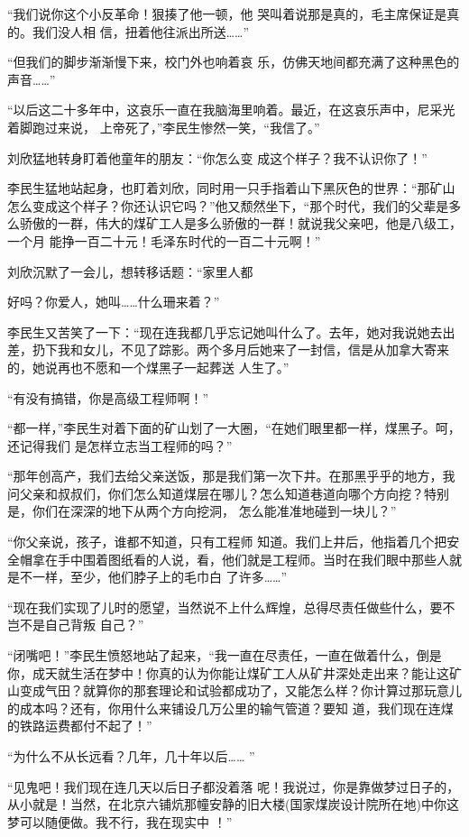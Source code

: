 \documentclass{article}
\begin{document}
“我们说你这个小反革命！狠揍了他一顿，他
\newpage
哭叫着说那是真的，毛主席保证是真的。我们没人相
信，扭着他往派出所送……” 

“但我们的脚步渐渐慢下来，校门外也响着哀
乐，仿佛天地间都充满了这种黑色的声音……” 

“以后这二十多年中，这哀乐一直在我脑海里响着。最近，在这哀乐声中，尼采光着脚跑过来说，
上帝死了，”李民生惨然一笑，“我信了。” 

刘欣猛地转身盯着他童年的朋友：“你怎么变
成这个样子？我不认识你了！” 

李民生猛地站起身，也盯着刘欣，同时用一只手指着山下黑灰色的世界：“那矿山怎么变成这个样子？你还认识它吗？”他又颓然坐下，“那个时代，我们的父辈是多么骄傲的一群，伟大的煤矿工人是多么骄傲的一群！就说我父亲吧，他是八级工，一个月
能挣一百二十元！毛泽东时代的一百二十元啊！” 

刘欣沉默了一会儿，想转移话题：“家里人都
\newpage

好吗？你爱人，她叫……什么珊来着？” 

李民生又苦笑了一下：“现在连我都几乎忘记她叫什么了。去年，她对我说她去出差，扔下我和女儿，不见了踪影。两个多月后她来了一封信，信是从加拿大寄来的，她说再也不愿和一个煤黑子一起葬送
人生了。” 


“有没有搞错，你是高级工程师啊！” 

“都一样，”李民生对着下面的矿山划了一大圈，“在她们眼里都一样，煤黑子。呵，还记得我们
是怎样立志当工程师的吗？” 

“那年创高产，我们去给父亲送饭，那是我们第一次下井。在那黑乎乎的地方，我问父亲和叔叔们，你们怎么知道煤层在哪儿？怎么知道巷道向哪个方向挖？特别是，你们在深深的地下从两个方向挖洞，
怎么能准准地碰到一块儿？” 

“你父亲说，孩子，谁都不知道，只有工程师
\newpage
知道。我们上井后，他指着几个把安全帽拿在手中围着图纸看的人说，看，他们就是工程师。当时在我们眼中那些人就是不一样，至少，他们脖子上的毛巾白
了许多……” 

“现在我们实现了儿时的愿望，当然说不上什么辉煌，总得尽责任做些什么，要不岂不是自己背叛
自己？” 

“闭嘴吧！”李民生愤怒地站了起来，“我一直在尽责任，一直在做着什么，倒是你，成天就生活在梦中！你真的认为你能让煤矿工人从矿井深处走出来？能让这矿山变成气田？就算你的那套理论和试验都成功了，又能怎么样？你计算过那玩意儿的成本吗？还有，你用什么来铺设几万公里的输气管道？要知
道，我们现在连煤的铁路运费都付不起了！” 

“为什么不从长远看？几年，几十年以后……
” 

“见鬼吧！我们现在连几天以后日子都没着落
\newpage
呢！我说过，你是靠做梦过日子的，从小就是！当然，在北京六铺炕那幢安静的旧大楼(国家煤炭设计院所在地)中你这梦可以随便做。我不行，我在现实中
！” 
\end{document}
